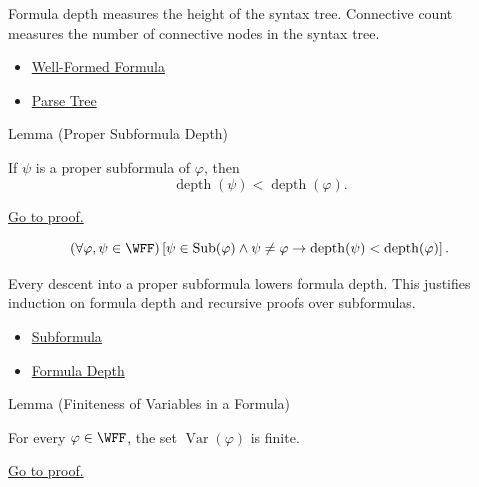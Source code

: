 \begin{remark*}[Interpretation]
Formula depth measures the height of the syntax tree. Connective count measures the number of connective nodes in the syntax tree.
\end{remark*}

\begin{dependencies}
\begin{itemize}
  \item \hyperref[def:well-formed-formula]{Well-Formed Formula}
  \item \hyperref[def:parse-tree-propositional-logic]{Parse Tree}
\end{itemize}
\end{dependencies}
\begin{lemmabox}{Lemma (Proper Subformula Depth)}
\begin{lemma}
\label{lem:proper-subformula-depth-propositional-logic}
If \(\psi\) is a proper subformula of \(\varphi\), then
\[
\operatorname{depth}(\psi)<\operatorname{depth}(\varphi).
\]

\noindent\hyperref[prf:proper-subformula-depth-propositional-logic]{Go to proof.}
\end{lemma}
\end{lemmabox}

\begin{remark*}
\[
(\forall\varphi,\psi\in\WFF)
\left[
\psi\in\operatorname{Sub}(\varphi)\land \psi\ne\varphi
\to
\operatorname{depth}(\psi)<\operatorname{depth}(\varphi)
\right].
\]
\end{remark*}

\begin{remark*}[Interpretation]
Every descent into a proper subformula lowers formula depth. This justifies induction on formula depth and recursive proofs over subformulas.
\end{remark*}

\begin{dependencies}
\begin{itemize}
  \item \hyperref[def:subformula-propositional-logic]{Subformula}
  \item \hyperref[def:formula-depth-propositional-logic]{Formula Depth}
\end{itemize}
\end{dependencies}
\begin{lemmabox}{Lemma (Finiteness of Variables in a Formula)}
\begin{lemma}
\label{lem:finiteness-of-variables-propositional-formulas}
For every \(\varphi\in\WFF\), the set \(\operatorname{Var}(\varphi)\) is finite.

\noindent\hyperref[prf:finiteness-of-variables-propositional-formulas]{Go to proof.}
\end{lemma}
\end{lemmabox}

